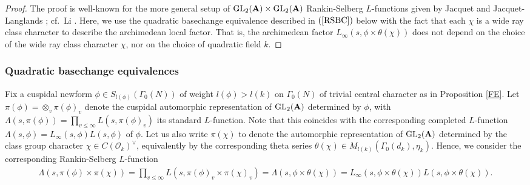 \documentclass{amsart}
\theoremstyle{definition}
\theoremstyle{definition}
\theoremstyle{definition}
\begin{document}
\begin{proof} The proof is well-known for the more general setup of $\operatorname{GL}_2({\bf{A}}) \times \operatorname{GL}_2({\bf{A}})$
Rankin-Selberg $L$-functions given by Jacquet \cite{Ja} and Jacquet-Langlands \cite{JL}; cf.~Li \cite[Theorem 2.2, Example 2]{Li}. Here,
we use the quadratic basechange equivalence described in $(\ref{RSBC})$ below with the fact that each $\chi$ is a wide ray class character to describe
the archimedean local factor. That is, the archimedean factor $L_{\infty}(s, \phi \times \theta(\chi))$ does not depend 
on the choice of the wide ray class character $\chi$, nor on the choice of quadratic field $k$. \end{proof}

\subsubsection{Quadratic basechange equivalences}

Fix a cuspidal newform $\phi \in S_{l(\phi)}(\Gamma_0(N))$ of weight $l(\phi) > l(k)$ on $\Gamma_0(N)$ of trivial central character 
as in Proposition \ref{FE}. Let $\pi(\phi) = \otimes_v \pi(\phi)_v$ denote the cuspidal automorphic representation of 
$\operatorname{GL}_2({\bf{A}})$ determined by $\phi$, with $\Lambda(s, \pi(\phi)) = \prod_{v \leq \infty} L(s, \pi(\phi)_v)$
its standard $L$-function. Note that this coincides with the corresponding completed $L$-function 
$\Lambda(s, \phi) = L_{\infty}(s, \phi) L(s, \phi)$ of $\phi$. Let us also write $\pi(\chi)$ to denote the automorphic
representation of $\operatorname{GL}_2({\bf{A}})$ determined by the class group character $\chi \in C(\mathcal{O}_k)^{\vee}$,
equivalently by the corresponding theta series $\theta(\chi) \in M_{l(k)}(\Gamma_0(d_k), \eta_k)$. 
Hence, we consider the corresponding Rankin-Selberg $L$-function 
\begin{align*} \Lambda(s, \pi(\phi) \times \pi(\chi)) = \prod_{v \leq \infty} L(s, \pi(\phi)_v \times \pi(\chi)_v) 
= \Lambda(s, \phi \times \theta(\chi)) = L_{\infty}(s, \phi \times \theta(\chi)) L(s, \phi \times \theta(\chi)).\end{align*}
\end{document}
